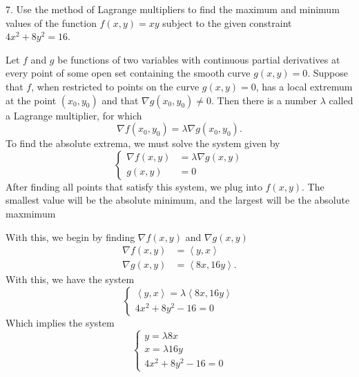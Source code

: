 \documentclass{report}
\begin{document}
    \bigbreak \noindent 
    \begin{mdframed}
       7. Use the method of Lagrange multipliers to find the maximum and minimum values of the function $f(x, y) = xy$ subject to the given constraint $4x^2 + 8y^2 = 16$. 
    \end{mdframed}
    \bigbreak \noindent 
    \begin{remark}
        Let $f$ and $g$ be functions of two variables with continuous partial derivatives at every point of some open set containing the smooth curve $g(x,y)=0$. Suppose that $f$, when restricted to points on the curve $g(x,y)=0$, has a local extremum at the point $(x_0,y_0)$ and that $\nabla g(x_0,y_0) \neq 0$. Then there is a number $\lambda$ called a Lagrange multiplier, for which
        \[
            \nabla f(x_0,y_0) = \lambda \nabla g(x_0,y_0).
        \]
        \bigbreak \noindent 
        To find the absolute extrema, we must solve the system given by
           \begin{equation}
                \begin{cases}
                     \nabla f(x, y)&=\lambda \nabla g(x,y) \\ 
                     g(x,y)&=0
                \end{cases}
            \end{equation}
            \bigbreak \noindent 
            After finding all points that satisfy this system, we plug into $f(x,y)$. The smallest value will be the absolute minimum, and the largest will be the absolute maxmimum
    \end{remark}
    \bigbreak \noindent 
    With this, we begin by finding $\nabla f(x,y) $ and $\nabla g(x,y) $
    \begin{align*}
        \nabla f(x,y) &= \left\langle y,x \right\rangle \\
        \nabla g(x,y) &= \left\langle 8x, 16y \right\rangle
    .\end{align*}
    With this, we have the system
       \begin{equation}
            \begin{cases}
                \left\langle y,x \right\rangle  =\lambda \left\langle 8x,16y \right\rangle \\
                4x^{2} + 8y^{2} -16 =0
            \end{cases}
        \end{equation}
        \bigbreak \noindent 
        Which implies the system
           \begin{equation}
                \begin{cases}
                    y = \lambda 8x \\
                    x = \lambda 16y \\
                    4x^{2} + 8y^{2} -16 =0
                \end{cases}
            \end{equation}
\end{document}
